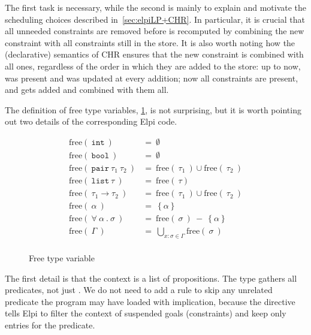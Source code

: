 \documentclass[a4paper, 11pt]{book}
\begin{document}
The first task is necessary, while the second is mainly to explain and
motivate the scheduling choices described in~\cref{sec:elpiLP+CHR}. In
particular, it is crucial that all unneeded  constraints are
removed before  is recomputed by combining the new constraint
with all  constraints still in the store. It is also worth
noting how the (declarative) semantics of CHR ensures that the new
 constraint is combined with all  ones, regardless
of the order in which they are added to the store: up to now, 
was present and was updated at every  addition; now all
 constraints are present, and  gets added and
combined with them all.

The definition of free type variables, \cref{img:free}, is not surprising,
but it is worth pointing out two details of the corresponding Elpi code.

\begin{figure}
$$
\begin{array}{ll}
  \text{free}(\ \mathtt{int}\ ) &=\ \emptyset\\
  \text{free}(\ \mathtt{bool}\ ) &=\ \emptyset\\
  \text{free}(\ \mathtt{pair}\ \tau_1\ \tau_2\ ) &=\ \text{free}(\ \tau_1\ )\cup \text{free}(\ \tau_2\ ) \\
  \text{free}(\ \mathtt{list}\ \tau\ ) &=\ \text{free}(\ \tau ) \\
  \text{free}(\ \tau_1 \to \tau_2\ ) &=\ \text{free}(\ \tau_1\ )\cup \text{free}(\ \tau_2\ ) \\
  \text{free}(\ \alpha\ ) &=\ \left\{\alpha\right\}\\
  \text{free}(\ \forall\ \alpha\ .\ \sigma\ ) &=\ \text{free}(\ \sigma\ )\  -\  \left\{\alpha\right\}\\
  \text{free}(\ \Gamma\ ) &=\ \bigcup\limits_{x:\sigma \in \Gamma}\text{free}(\ \sigma\ )\\
\end{array}
$$
\caption{Free type variable\label{img:free}}
\end{figure}


The first detail is that the context is a list of propositions. The
 type gathers all predicates, not just . We do not need
to add a rule to skip any unrelated predicate the program may have loaded with
implication, because the  directive tells Elpi to filter the context of suspended goals
(constraints) and keep only entries for the  predicate.
\end{document}

